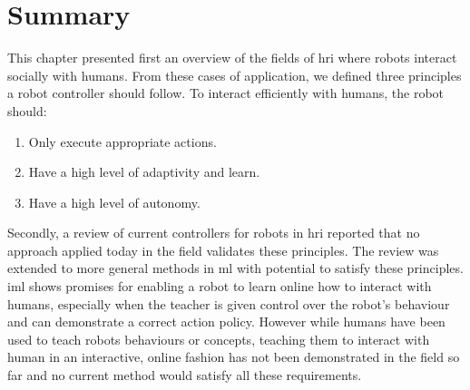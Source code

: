 


\section{Summary}

This chapter presented first an overview of the fields of \gls{hri} where robots interact socially with humans. From these cases of application, we defined three principles a robot controller should follow. To interact efficiently with humans, the robot should:
\begin{enumerate}
   	\item Only execute appropriate actions.
   	\item Have a high level of adaptivity and learn.
   	\item Have a high level of autonomy.
\end{enumerate}

Secondly, a review of current controllers for robots in \gls{hri} reported that no approach applied today in the field validates these principles. The review was extended to more general methods in \gls{ml} with potential to satisfy these principles. \gls{iml} shows promises for enabling a robot to learn online how to interact with humans, especially when the teacher is given control over the robot's behaviour and can demonstrate a correct action policy. However while humans have been used to teach robots behaviours or concepts, teaching them to interact with human in an interactive, online fashion has not been demonstrated in the field so far and no current method would satisfy all these requirements.